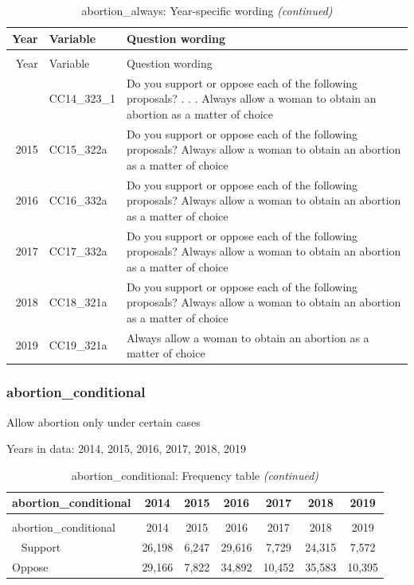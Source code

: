 \documentclass[12pt]{article}
\begin{document}
\begin{longtable}[t]{rl>{\raggedright\arraybackslash}p{10cm}}
\caption{\label{tab:unnamed-chunk-4}abortion\_always: Year-specific wording}\\
\toprule
Year & Variable & Question wording\\
\midrule
\endfirsthead
\caption[]{abortion\_always: Year-specific wording \textit{(continued)}}\\
\toprule
Year & Variable & Question wording\\
\midrule
\endhead
\
\endfoot
\bottomrule
\endlastfoot
2014 & CC14\_323\_1 & Do you support or oppose each of the following proposals? . . . Always allow a woman to obtain an abortion as a matter of choice\\
2015 & CC15\_322a & Do you support or oppose each of the following proposals? Always allow a woman to obtain an abortion as a matter of choice\\
2016 & CC16\_332a & Do you support or oppose each of the following proposals? Always allow a woman to obtain an abortion as a matter of choice\\
2017 & CC17\_332a & Do you support or oppose each of the following proposals? Always allow a woman to obtain an abortion as a matter of choice\\
2018 & CC18\_321a & Do you support or oppose each of the following proposals? Always allow a woman to obtain an abortion as a matter of choice\\
2019 & CC19\_321a & Always allow a woman to obtain an abortion as a matter of choice\\*
\end{longtable}

\subsubsection{abortion\_conditional}\label{abortion_conditional}

Allow abortion only under certain cases

Years in data: 2014, 2015, 2016, 2017, 2018, 2019

\begin{longtable}[t]{lcccccc}
\caption{\label{tab:unnamed-chunk-4}abortion\_conditional: Frequency table}\\
\toprule
abortion\_conditional & 2014 & 2015 & 2016 & 2017 & 2018 & 2019\\
\midrule
\endfirsthead
\caption[]{abortion\_conditional: Frequency table \textit{(continued)}}\\
\toprule
abortion\_conditional & 2014 & 2015 & 2016 & 2017 & 2018 & 2019\\
\midrule
\endhead
\
\endfoot
\bottomrule
\endlastfoot
Support & 26,198 & 6,247 & 29,616 & 7,729 & 24,315 & 7,572\\
Oppose & 29,166 & 7,822 & 34,892 & 10,452 & 35,583 & 10,395\\*
\end{longtable}
\end{document}
